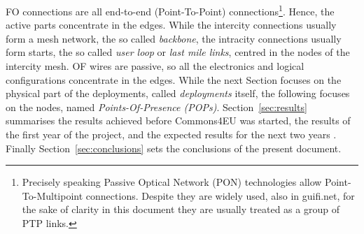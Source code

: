 FO connections are all end-to-end (Point-To-Point) connections\footnote{Precisely speaking Passive Optical Network (PON) technologies allow Point-To-Multipoint connections. Despite they are widely used, also in guifi.net, for the sake of clarity in this document they are usually treated as a group of PTP links.}. Hence, the active parts concentrate in the edges. While the intercity connections usually form a mesh network, the so called \emph{backbone}, the intracity connections usually form starts, the so called \emph{user loop} or \emph{last mile links}, centred in the nodes of the intercity mesh. OF wires are passive, so all the electronics and logical configurations concentrate in the edges. While the next Section focuses on the physical part of the deployments, called \emph{deployments} itself, the following focuses on the nodes, named \emph{Points-Of-Presence (POPs)}. Section~\ref{sec:results} summarises the results achieved before Commons4EU was started, the results of the first year of the project, and the expected results for the next two years . Finally Section~\ref{sec:conclusions} sets the conclusions of the present document.
